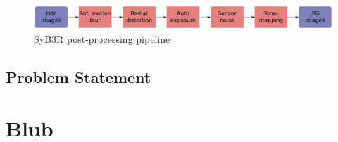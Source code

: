 \documentclass[a4paper,cleardoubleempty,BCOR1cm]{scrbook}
\begin{document}
\begin{figure}[h]
	\centering
	\includegraphics[width=\textwidth]{images/SyB3R_pp.png}
	\caption{SyB3R post-processing pipeline}
	\label{SyB3R_pp}
\end{figure}


\newpage

\section{Problem Statement}



\appendix
\chapter{Blub}



\end{document}
